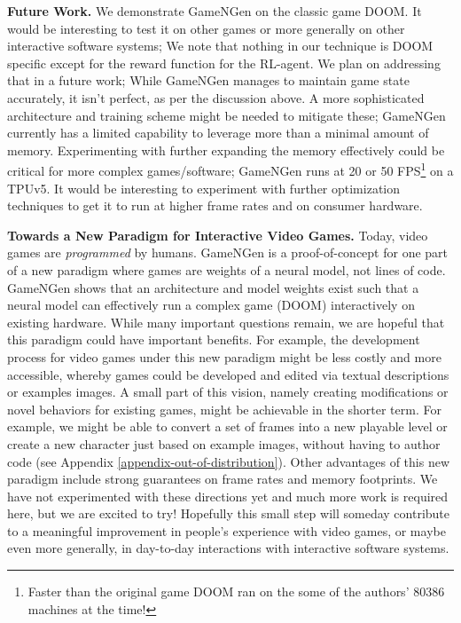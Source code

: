\documentclass{article} %
\begin{document}
\textbf{Future Work.} We demonstrate GameNGen on the classic game DOOM.
It would be interesting to test it on other games or more generally on other interactive software systems;
We note that nothing in our technique is DOOM specific except for the reward function for the RL-agent. We plan on addressing that in a future work;
While GameNGen manages to maintain game state accurately, it isn't perfect, as per the discussion above. A more sophisticated architecture and training scheme might be needed to mitigate these;
GameNGen currently has a limited capability to leverage more than a minimal amount of memory. Experimenting with further expanding the memory effectively could be critical for more complex games/software;
GameNGen runs at 20 or 50 FPS\footnote{Faster than the original game DOOM ran on the some of the authors' 80386 machines at the time!} on a TPUv5. It would be interesting to experiment with further optimization techniques to get it to run at higher frame rates and on consumer hardware.

\textbf{Towards a New Paradigm for Interactive Video Games.}
\label{appendix:new paradigm}
Today, video games are \emph{programmed} by humans.
GameNGen is a proof-of-concept for one part of a new paradigm where games are weights of a neural model, not lines of code.
GameNGen shows that an architecture and model weights exist such that a neural model can effectively run a complex game (DOOM) interactively on existing hardware.
While many important questions remain, we are hopeful that this paradigm could have important benefits.
For example, the development process for video games under this new paradigm might be less costly and more accessible, whereby games could be developed and edited via textual descriptions or examples images.
A small part of this vision, namely creating modifications or novel behaviors for existing games, might be achievable in the shorter term. 
For example, we might be able to convert a set of frames into a new playable level or create a new character just based on example images, without having to author code (see Appendix \ref{appendix-out-of-distribution}).
Other advantages of this new paradigm include strong guarantees on frame rates and memory footprints.
We have not experimented with these directions yet and much more work is required here, but we are excited to try!
Hopefully this small step will someday contribute to a meaningful improvement in people’s experience with video games, or maybe even more generally, in day-to-day interactions with interactive software systems.
\end{document}
